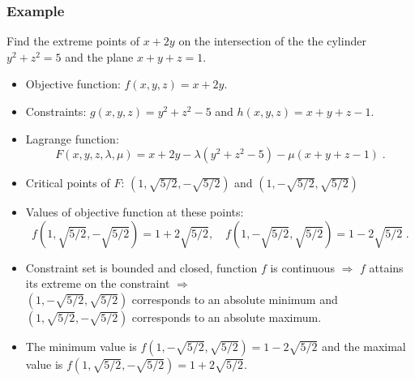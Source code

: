 \begin{frame}
  \frametitle{Example}

  Find the extreme points of $x+2y$ on the intersection of the the cylinder $y^2+z^2=5$ and the plane $x+y+z=1$.

\begin{itemize}
  \item \pause Objective function: \pause $f(x,y,z) = x+2y$.
  \item \pause Constraints: \pause $g(x,y,z) = y^2+z^2-5$ and $h(x,y,z) = x+y+z-1$.
  \item \pause Lagrange function:\pause
  $$F(x,y,z,\lambda,\mu) = x+2y - \lambda (y^2+z^2-5)- \mu (x+y+z-1)\; .$$
  \item \pause Critical points of $F$: \pause $(1,\sqrt{5/2},-\sqrt{5/2})$ and $(1,-\sqrt{5/2},\sqrt{5/2})$
\item \pause Values of objective function at these points:\pause
  $$f(1,\sqrt{5/2},-\sqrt{5/2}) = 1+2\sqrt{5/2}, \quad  f(1,-\sqrt{5/2},\sqrt{5/2}) = 1-2\sqrt{5/2}\; .$$
  \item \pause Constraint set is bounded and closed, function $f$ is continuous $\Longrightarrow$
       $f$ attains its extreme on the constraint $\Longrightarrow$\\
       $(1,-\sqrt{5/2},\sqrt{5/2})$ corresponds to an absolute minimum and $(1,\sqrt{5/2},-\sqrt{5/2})$ corresponds to an absolute maximum.
  \item The minimum value is $f(1,-\sqrt{5/2},\sqrt{5/2}) = 1-2\sqrt{5/2}$ and the maximal value is $f(1,\sqrt{5/2},-\sqrt{5/2})=1+2\sqrt{5/2}$.
\end{itemize}

\end{frame}